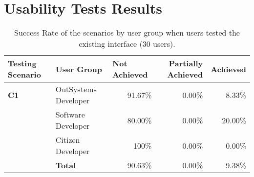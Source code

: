 \chapter{Usability Tests Results}
\label{app:usability_tests_results}

\begin{table}[tb]
    \caption{Success Rate of the scenarios by user group when users tested the existing interface (30 users).}
    \label{tab:effectiveness_existing_interface}
    \begin{tabular}{@{}llrrr@{}}
    \toprule
    \rowcolor[HTML]{EFEFEF} 
    \textbf{Testing Scenario} & \textbf{User Group}  & \multicolumn{1}{l}{\cellcolor[HTML]{EFEFEF}\textbf{Not Achieved}} & \multicolumn{1}{C{2cm}}{\cellcolor[HTML]{EFEFEF}\textbf{Partially Achieved}} & \multicolumn{1}{l}{\cellcolor[HTML]{EFEFEF}\textbf{Achieved}} \\ \midrule
    \textbf{C1}               & OutSystems Developer & 91.67\%                                                           & 0.00\%                                                                  & 8.33\%                                                        \\
                              & Software Developer   & 80.00\%                                                           & 0.00\%                                                                  & 20.00\%                                                       \\
                              & Citizen Developer    & 100\%                                                             & 0.00\%                                                                  & 0.00\%                                                        \\
                              & \textbf{Total}       & 90.63\%                                                           & 0.00\%                                                                  & 9.38\%                                                        \\ \midrule

\end{tabular}
\end{table}
